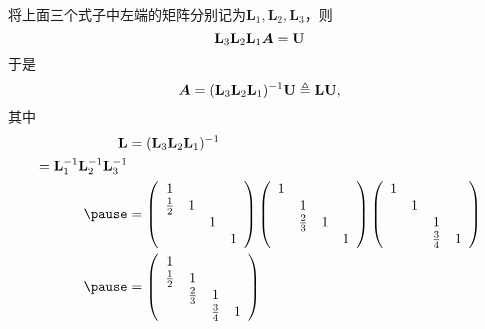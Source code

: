 \begin{frame}\ft{\secname}
\begin{jie}[续]
        将上面三个式子中左端的矩阵分别记为$\mathbf{L}_1,\mathbf{L}_2,\mathbf{L}_3$，则
        $$
        \mathbf{L}_3\mathbf{L}_2\mathbf{L}_1 \boldsymbol{A} = \mathbf{U}
        $$\pause 
  于是
  $$
  \boldsymbol{A} = (\mathbf{L}_3\mathbf{L}_2\mathbf{L}_1)^{-1}\mathbf{U} \triangleq \mathbf{L}\mathbf{U},
  $$\pause
  其中
  $$
  \begin{aligned}
    \mathbf{L}
    &=  (\mathbf{L}_3\mathbf{L}_2\mathbf{L}_1)^{-1} \\ =  \mathbf{L}_1^{-1}\mathbf{L}_2^{-1}\mathbf{L}_3^{-1}\\ \pause
    &=   
        \left(
        \begin{array}{cccc}
          1 & && \\
          \frac12 &1&&\\
            &&1&\\
            &&&1
        \end{array}
                \right)
                \left(
                \begin{array}{cccc}
                  1 & && \\
                    &1&&\\
                    &\frac23&1&\\
                    &&&1
                \end{array}
                        \right)
                        \left(
                        \begin{array}{cccc}
                          1 & && \\
                            &1&&\\
                            &&1&\\
                            &&\frac34&1
                        \end{array}
                                       \right) \\ \pause
    &=   \left(
        \begin{array}{cccc}
          1 & && \\
          \frac12 &1&&\\
            &\frac23&1&\\
            &&\frac34&1
        \end{array}
                       \right)
  \end{aligned}    
  $$
\end{jie}
 
\end{frame}

